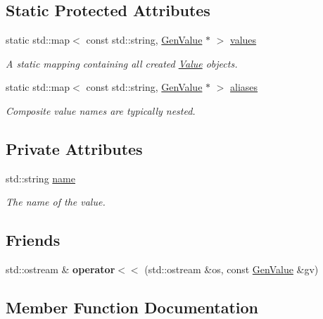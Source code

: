 \subsection*{Static Protected Attributes}
\begin{DoxyCompactItemize}
\item 
static std\+::map$<$ const std\+::string, \hyperlink{classfv_1_1GenValue}{Gen\+Value} $\ast$ $>$ \hyperlink{classfv_1_1GenValue_abbb57abc392c44d1f7ad5e7e74a75297}{values}
\begin{DoxyCompactList}\small\item\em A static mapping containing all created \hyperlink{classfv_1_1Value}{Value} objects. \end{DoxyCompactList}\item 
static std\+::map$<$ const std\+::string, \hyperlink{classfv_1_1GenValue}{Gen\+Value} $\ast$ $>$ \hyperlink{classfv_1_1GenValue_ab58b81925a05884bbebca0d870da80d0}{aliases}
\begin{DoxyCompactList}\small\item\em Composite value names are typically nested. \end{DoxyCompactList}\end{DoxyCompactItemize}
\subsection*{Private Attributes}
\begin{DoxyCompactItemize}
\item 
std\+::string \hyperlink{classfv_1_1GenValue_a610f89ee441eaad4c9e78f74d6bde93b}{name}
\begin{DoxyCompactList}\small\item\em The name of the value. \end{DoxyCompactList}\end{DoxyCompactItemize}
\subsection*{Friends}
\begin{DoxyCompactItemize}
\item 
\hypertarget{classfv_1_1GenValue_a98a93398ab5dafb2a572c64908d687eb}{}\label{classfv_1_1GenValue_a98a93398ab5dafb2a572c64908d687eb} 
std\+::ostream \& {\bfseries operator$<$$<$} (std\+::ostream \&os, const \hyperlink{classfv_1_1GenValue}{Gen\+Value} \&gv)
\end{DoxyCompactItemize}


\subsection{Member Function Documentation}
\hypertarget{classfv_1_1GenValue_a26160e53542b728f9e0c11495dce3c20}{}\label{classfv_1_1GenValue_a26160e53542b728f9e0c11495dce3c20} 
